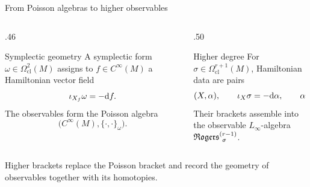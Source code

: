 \documentclass[beamer,10pt]{standalone}
\begin{document}
\begin{frame}{From Poisson algebras to higher observables}
  \begin{columns}[T]
    \begin{column}{.46\textwidth}
      \begin{block}{Symplectic geometry}
        A symplectic form $\omega\in\Omega^2_{\mathrm{cl}}(M)$ assigns to
        $f\in C^\infty(M)$ a Hamiltonian vector field
        \[
          \iota_{X_f}\omega=-\d f.
        \]
        The observables form the Poisson algebra
        \[
          \big(C^\infty(M),\{\cdot,\cdot\}_\omega\big).
        \]
      \end{block}
    \end{column}
    \pause
    \begin{column}{.50\textwidth}
      \begin{block}{Higher degree}
        For $\sigma\in\Omega^{r+1}_{\mathrm{cl}}(M)$, Hamiltonian data are pairs
        \[
          (X,\alpha),\qquad \iota_X\sigma=-\d\alpha,
          \qquad \alpha\in\Omega^{r-1}(M).
        \]
        Their brackets assemble into the observable
        $L_\infty$-algebra $\Rogers[\sigma]{r-1}$.
      \end{block}
    \end{column}
  \end{columns}

  \vfill\pause
  \begin{claimblock}
    Higher brackets replace the Poisson bracket and record the geometry of
    observables together with its homotopies.
  \end{claimblock}
\end{frame}
\end{document}
